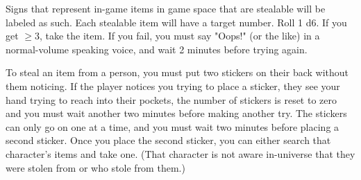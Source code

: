 \documentclass[green]{LRSguildcamp1}
\begin{document}
\name{\gStealing{}}

Signs that represent in-game items in game space that are stealable will be labeled as such. Each stealable item will have a target number. Roll 1 d6.  If you get $\ge 3$, take the item. If you fail, you must say "Oops!" (or the like) in a normal-volume speaking voice, and wait 2 minutes before trying again.

To steal an item from a person, you must put two stickers on their back without them noticing.  
If the player notices you trying to place a sticker, they see your hand trying to reach into their pockets, the number of stickers is reset to zero and you must wait another two minutes before making another try.  
The stickers can only go on one at a time, and you must wait two minutes before placing a second sticker.  Once you place the second sticker, you can either search that character's items and take one.  (That character is not aware in-universe that they were stolen from or who stole from them.)
\end{document}
